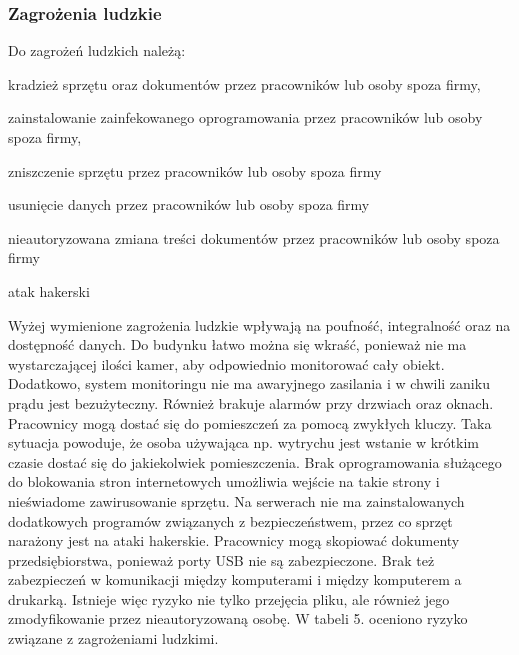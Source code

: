 \subsubsection{Zagrożenia ludzkie}
Do zagrożeń ludzkich należą: 
\begin{itemize*}
	\item kradzież sprzętu oraz dokumentów przez pracowników lub osoby spoza firmy,
	\item zainstalowanie zainfekowanego oprogramowania przez pracowników lub osoby spoza firmy,
	\item zniszczenie sprzętu przez pracowników lub osoby spoza firmy
	\item usunięcie danych przez pracowników lub osoby spoza firmy
	\item nieautoryzowana zmiana treści dokumentów przez pracowników lub osoby spoza firmy
	\item atak hakerski 
\end{itemize*}

Wyżej wymienione zagrożenia ludzkie wpływają na poufność, integralność oraz na dostępność danych. Do budynku łatwo można się wkraść, ponieważ nie ma wystarczającej ilości kamer, aby odpowiednio monitorować cały obiekt. Dodatkowo, system monitoringu nie ma awaryjnego zasilania i w chwili zaniku prądu jest bezużyteczny. Również brakuje alarmów przy drzwiach oraz oknach. Pracownicy mogą dostać się do pomieszczeń za pomocą zwykłych kluczy. Taka sytuacja powoduje, że osoba używająca np. wytrychu jest wstanie w krótkim czasie dostać się do jakiekolwiek pomieszczenia. Brak oprogramowania służącego do blokowania stron internetowych umożliwia wejście na takie strony i nieświadome zawirusowanie sprzętu. Na serwerach nie ma zainstalowanych dodatkowych programów związanych z bezpieczeństwem, przez co sprzęt narażony jest na ataki hakerskie. Pracownicy mogą skopiować dokumenty przedsiębiorstwa, ponieważ porty USB nie są zabezpieczone. Brak też zabezpieczeń w komunikacji między komputerami i między komputerem a drukarką. Istnieje więc ryzyko nie tylko przejęcia pliku, ale również jego zmodyfikowanie przez nieautoryzowaną osobę.
W tabeli 5. oceniono ryzyko związane z zagrożeniami ludzkimi.

